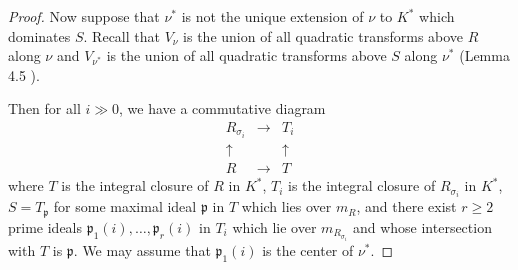 \documentclass[11pt]{amsart}
\begin{document}
\begin{proof}
 Now suppose that $\nu^*$ is not the unique extension of $\nu$ to $K^*$ which dominates $S$.   Recall that $V_{\nu}$ is the union of all quadratic transforms above $R$ along $\nu$ and $V_{\nu^*}$ is the union of all quadratic transforms above $S$ along $\nu^*$ (Lemma 4.5 \cite{RTM}).
 
 Then for all $i\gg 0$, we have a commutative diagram
 $$
 \begin{array}{lll}
 R_{\sigma_i}&\rightarrow& T_i\\
 \uparrow&&\uparrow\\
 R&\rightarrow &T
 \end{array}
 $$
 where $T$ is the integral closure of $R$ in $K^*$, $T_i$ is the integral closure of $R_{\sigma_i}$ in $K^*$, $S=T_{\mathfrak p}$ for some maximal ideal $\mathfrak p$ in $T$ which lies over $m_R$,
 and there exist $r\ge 2$ prime ideals $\mathfrak p_1(i),\ldots,\mathfrak p_r(i)$ in $T_i$ which lie over $m_{R_{\sigma_i}}$ and whose intersection with $T$ is $\mathfrak p$. We may assume that $\mathfrak p_1(i)$ is the center of $\nu^*$. 
 

\end{proof}
\end{document}
